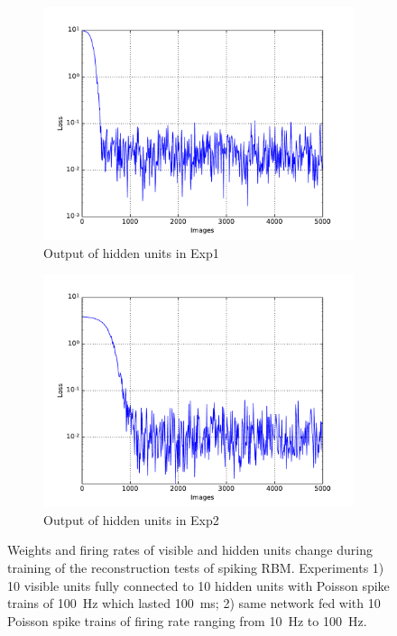 \begin{figure}
\begin{subfigure}[t]{0.4\textwidth}
		\includegraphics[width=\textwidth]{pics_sdlm/13_exp_SRBM_noise_long/exp1_mse_nons.pdf}
		\caption{Output of hidden units in Exp1}
	\end{subfigure}
	\begin{subfigure}[t]{0.4\textwidth}
		\includegraphics[width=\textwidth]{pics_sdlm/13_exp_SRBM_noise_long/exp2_mse_nons.pdf}
		\caption{Output of hidden units in Exp2}
	\end{subfigure}
	\caption{Weights and firing rates of visible and hidden units change during training of the reconstruction tests of spiking RBM. 
		Experiments 1) 10 visible units fully connected to 10 hidden units with Poisson spike trains of 100~Hz which lasted 100~ms; 2) same network fed with 10 Poisson spike trains of firing rate ranging from 10~Hz to 100~Hz.}
\end{figure}


